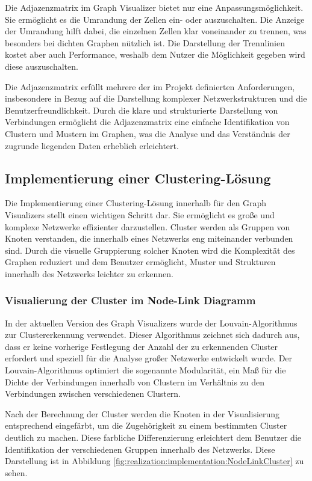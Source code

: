 Die Adjazenzmatrix im Graph Visualizer bietet nur eine Anpassungsmöglichkeit. Sie ermöglicht es die Umrandung der Zellen ein- oder auszuschalten. Die Anzeige der Umrandung hilft dabei, die einzelnen Zellen klar voneinander zu trennen, was besonders bei dichten Graphen nützlich ist. Die Darstellung der Trennlinien kostet aber auch Performance, weshalb dem Nutzer die Möglichkeit gegeben wird diese auszuschalten.

Die Adjazenzmatrix erfüllt mehrere der im Projekt definierten Anforderungen, insbesondere in Bezug auf die Darstellung komplexer Netzwerkstrukturen und die Benutzerfreundlichkeit. Durch die klare und strukturierte Darstellung von Verbindungen ermöglicht die Adjazenzmatrix eine einfache Identifikation von Clustern und Mustern im Graphen, was die Analyse und das Verständnis der zugrunde liegenden Daten erheblich erleichtert.

\subsection{Implementierung einer Clustering-Lösung}

Die Implementierung einer Clustering-Lösung innerhalb für den Graph Visualizers stellt einen wichtigen Schritt dar. Sie ermöglicht es große und komplexe Netzwerke effizienter darzustellen. Cluster werden als Gruppen von Knoten verstanden, die innerhalb eines Netzwerks eng miteinander verbunden sind. Durch die visuelle Gruppierung solcher Knoten wird die Komplexität des Graphen reduziert und dem Benutzer ermöglicht, Muster und Strukturen innerhalb des Netzwerks leichter zu erkennen.

\subsubsection{Visualierung der Cluster im Node-Link Diagramm}

In der aktuellen Version des Graph Visualizers wurde der Louvain-Algorithmus zur Clustererkennung verwendet. Dieser Algorithmus zeichnet sich dadurch aus, dass er keine vorherige Festlegung der Anzahl der zu erkennenden Cluster erfordert und speziell für die Analyse großer Netzwerke entwickelt wurde. Der Louvain-Algorithmus optimiert die sogenannte Modularität, ein Maß für die Dichte der Verbindungen innerhalb von Clustern im Verhältnis zu den Verbindungen zwischen verschiedenen Clustern.

Nach der Berechnung der Cluster werden die Knoten in der Visualisierung entsprechend eingefärbt, um die Zugehörigkeit zu einem bestimmten Cluster deutlich zu machen. Diese farbliche Differenzierung erleichtert dem Benutzer die Identifikation der verschiedenen Gruppen innerhalb des Netzwerks. Diese Darstellung ist in Abbildung \ref{fig:realization:implementation:NodeLinkCluster} zu sehen.

